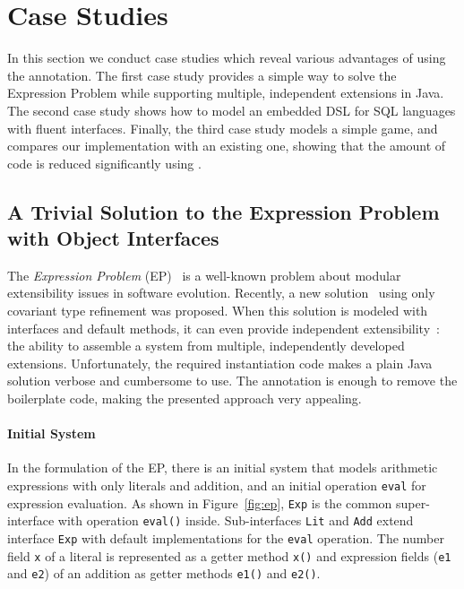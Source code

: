 \section{Case Studies}
In this section we conduct \numOfCaseStudies case studies which reveal various
advantages of using the \mixin annotation. The first case study provides a
simple way to solve the Expression Problem while supporting multiple,
independent extensions in Java.  The second case study shows how to model an
embedded DSL for SQL languages with fluent interfaces. Finally, the third
case study models a simple game, and compares our implementation with an
existing one, showing that the amount of code is reduced significantly using \mixin.

\subsection{A Trivial Solution to the Expression Problem with Object Interfaces}

The \emph{Expression Problem} (EP)~\cite{wadler98expression} is a well-known
problem about modular extensibility issues in software evolution. Recently, a
new solution~\cite{eptrivially} using only covariant type refinement was
proposed. When this solution is modeled with interfaces and default methods, it
can even provide independent extensibility~\cite{zenger05independentlyextensible}: the ability to assemble a system
from multiple, independently developed extensions. Unfortunately, the
required instantiation code makes a plain Java solution verbose and cumbersome
to use. The \mixin annotation is enough to remove the boilerplate code, making
the presented approach very appealing.

\paragraph{Initial System}
In the formulation of the EP, there is an initial system that models
arithmetic expressions with only literals and addition, and an initial
operation \texttt{eval} for expression evaluation.
As shown in Figure~\ref{fig:ep}, \texttt{Exp} is the common
super-interface with operation \texttt{eval()}
inside. Sub-interfaces \texttt{Lit} and \texttt{Add} extend interface
\texttt{Exp} with default implementations for the \texttt{eval} operation. The
number field \texttt{x} of a literal is represented as a getter method
\texttt{x()} and expression fields (\texttt{e1} and \texttt{e2}) of an addition
as getter methods \texttt{e1()} and \texttt{e2()}.

